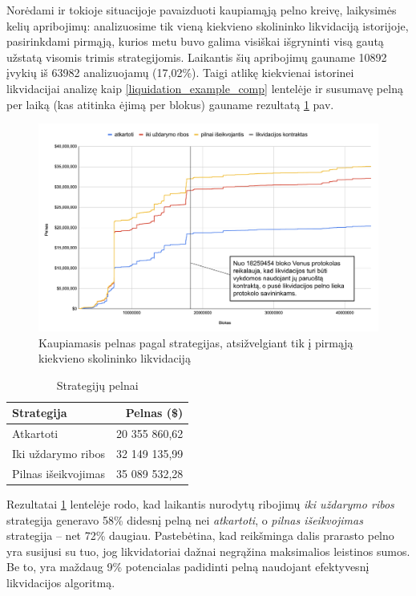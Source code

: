 \documentclass{VUMIFPSkursinis}
\begin{document}
Norėdami ir tokioje situacijoje pavaizduoti kaupiamąją pelno kreivę, laikysimės kelių apribojimų: analizuosime tik vieną kiekvieno skolininko likvidaciją istorijoje, pasirinkdami pirmąją, kurios metu buvo galima visiškai išgryninti visą gautą užstatą visomis trimis strategijomis. Laikantis šių apribojimų gauname 10892 įvykių iš 63982 analizuojamų (17,02\%). Taigi atlikę kiekvienai istorinei likvidacijai analizę kaip \ref{liquidation_example_comp} lentelėje ir susumavę pelną per laiką (kas atitinka ėjimą per blokus) gauname rezultatą \ref{img:bendras2} pav.

\begin{figure}[H]
  \centering
  \includegraphics[scale=0.4]{img/bendras4.png}
  \caption{Kaupiamasis pelnas pagal strategijas, atsižvelgiant tik į pirmąją kiekvieno skolininko likvidaciją}
  \label{img:bendras2}
\end{figure}

\begin{table}[h!]
  \centering
  \caption{Strategijų pelnai}
  \label{tab:strategiju_pelnai}
  \begin{tabular}{|l|r|}
  \hline
  \textbf{Strategija}                     & \textbf{Pelnas (\$)} \\ \hline
  Atkartoti                               & 20 355 860,62        \\ \hline
  Iki uždarymo ribos              & 32 149 135,99        \\ \hline
  Pilnas išeikvojimas                           & 35 089 532,28        \\ \hline
  \end{tabular}
  \end{table}

Rezultatai \ref{tab:strategiju_pelnai} lentelėje rodo, kad laikantis nurodytų ribojimų \textit{iki uždarymo ribos} strategija generavo 58\% didesnį pelną nei \textit{atkartoti}, o \textit{pilnas išeikvojimas} strategija – net 72\% daugiau. Pastebėtina, kad reikšminga dalis prarasto pelno yra susijusi su tuo, jog likvidatoriai dažnai negrąžina maksimalios leistinos sumos. Be to, yra maždaug 9\% potencialas padidinti pelną naudojant efektyvesnį likvidacijos algoritmą.
\end{document}
